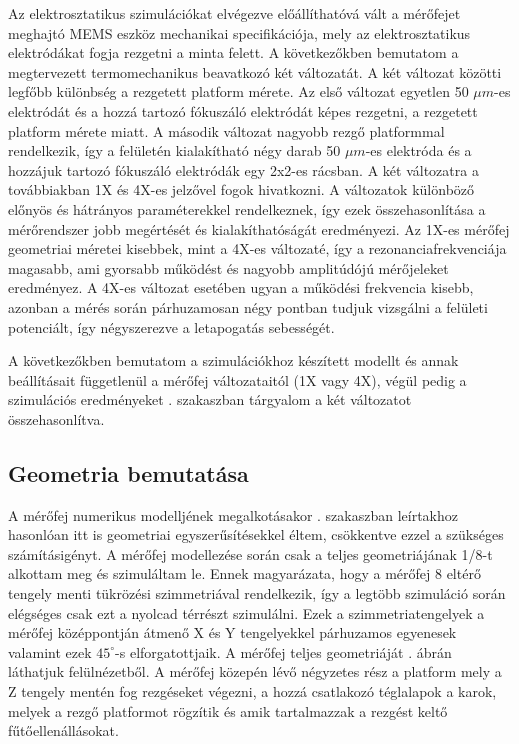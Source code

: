 Az elektrosztatikus szimulációkat elvégezve előállíthatóvá vált a mérőfejet meghajtó MEMS eszköz mechanikai specifikációja, mely az elektrosztatikus elektródákat fogja rezgetni a minta felett. A következőkben bemutatom a megtervezett termomechanikus beavatkozó két változatát. A két változat közötti legfőbb különbség a rezgetett platform mérete. Az első változat egyetlen 50 $\mu m$-es elektródát és a hozzá tartozó fókuszáló elektródát képes rezgetni, a rezgetett platform mérete miatt. A második változat nagyobb rezgő platformmal rendelkezik, így a felületén kialakítható négy darab 50 $\mu m$-es elektróda és a hozzájuk tartozó fókuszáló elektródák egy 2x2-es rácsban. A két változatra a továbbiakban 1X és 4X-es jelzővel fogok hivatkozni. A változatok különböző előnyös és hátrányos paraméterekkel rendelkeznek, így ezek összehasonlítása a mérőrendszer jobb megértését és kialakíthatóságát eredményezi. Az 1X-es mérőfej geometriai méretei kisebbek, mint a 4X-es változaté, így a rezonanciafrekvenciája magasabb, ami gyorsabb működést és nagyobb amplitúdójú mérőjeleket eredményez. A 4X-es változat esetében ugyan a működési frekvencia kisebb, azonban a mérés során párhuzamosan négy pontban tudjuk vizsgálni a felületi potenciált, így négyszerezve a letapogatás sebességét.

A következőkben bemutatom a szimulációkhoz készített modellt és annak beállításait függetlenül a mérőfej változataitól (1X vagy 4X), végül pedig a szimulációs eredményeket . szakaszban tárgyalom a két változatot összehasonlítva.

\subsection{Geometria bemutatása}

A mérőfej numerikus modelljének megalkotásakor . szakaszban leírtakhoz hasonlóan itt is geometriai egyszerűsítésekkel éltem, csökkentve ezzel a szükséges számításigényt. A mérőfej modellezése során csak a teljes geometriájának 1/8-t alkottam meg és szimuláltam le. Ennek magyarázata, hogy a mérőfej 8 eltérő tengely menti tükrözési szimmetriával rendelkezik, így a legtöbb szimuláció során elégséges csak ezt a nyolcad térrészt szimulálni. Ezek a szimmetriatengelyek a mérőfej középpontján átmenő X és Y tengelyekkel párhuzamos egyenesek valamint ezek  $45^\circ$-s elforgatottjaik. A mérőfej teljes geometriáját . ábrán láthatjuk felülnézetből. A mérőfej közepén lévő négyzetes rész a platform mely a Z tengely mentén fog rezgéseket végezni, a hozzá csatlakozó téglalapok a karok, melyek a rezgő platformot rögzítik és amik tartalmazzak a rezgést keltő fűtőellenállásokat.

